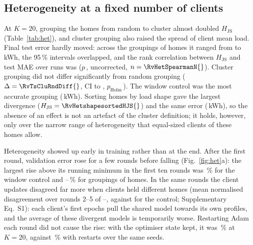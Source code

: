 \subsection{Heterogeneity at a fixed number of clients}
At $K=20$, grouping the homes from random to cluster almost doubled $H_{\mathrm{JS}}$ (Table~\ref{tab:het}), and
cluster grouping also raised the spread of client mean load. Final test error hardly moved: across the groupings of
homes it ranged from \RvHetMaeLo{} to \RvHetMaeHi{}\,kWh, the 95\,\% intervals overlapped, and the rank correlation between
$H_{\mathrm{JS}}$ and test MAE over runs was \RvHetSpearman{} ($p$\,\RvHetSpearmanP{}, uncorrected, $n=\RvHetSpearmanN{}$).
Cluster grouping did not differ significantly from random grouping ($\Delta=\RvTsCluRndDiff{}$, CI \RvTsCluRndLo{} to
\RvTsCluRndHi{}, $p_{\mathrm{Holm}}$\,\RvTsCluRndP{}). The window control was the most accurate grouping
(\RvHetwindowMAE{}\,kWh). Sorting homes by load shape gave the largest divergence ($H_{\mathrm{JS}}=\RvHetshapesortedHJS{}$)
and the same error (\RvHetshapesortedMAE{}\,kWh), so the absence of an effect is not an artefact of the cluster
definition; it holds, however, only over the narrow range of heterogeneity that equal-sized clients of these homes allow.

Heterogeneity showed up early in training rather than at the end. After the first round, validation error rose for a
few rounds before falling (Fig.~\ref{fig:het}a): the largest rise above its running minimum in the first ten rounds was
\RvRisewindow{}\,\% for the window control and \RvRiseHomeLo{}--\RvRiseHomeHi{}\,\% for groupings of homes. In the same
rounds the client updates disagreed far more when clients held different homes (mean normalised disagreement over
rounds 2--5 of \RvRhoEarlyHomeLo{}--\RvRhoEarlyHomeHi{}, against \RvRhoEarlywindow{} for the control; Supplementary
Eq.~S1): each client's first epochs pull the shared model towards its own profiles, and the average of these divergent
models is temporarily worse. Restarting Adam each round did not cause the rise: with the optimiser state kept, it was
\RvOptAdamKeepKtwozeroRise{}\,\% at $K=20$, against \RvOptAdamKtwozeroRise{}\,\% with restarts over the same seeds.

